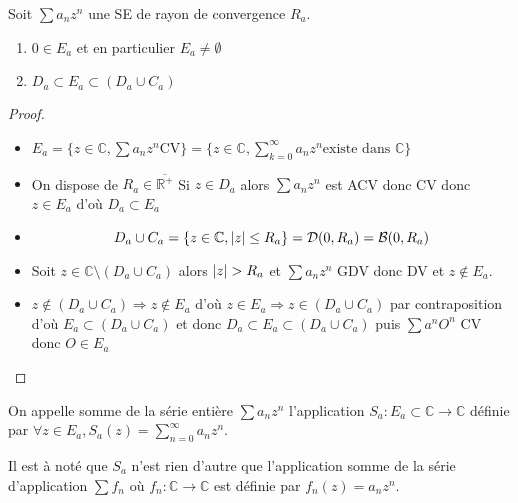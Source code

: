 \documentclass[11pt,hidelinks]{book}
\theoremstyle{mytheoremstyle}
\theoremstyle{mytheoremstyle}
\theoremstyle{mytheoremstyle}
\theoremstyle{mytheoremstyle}
\theoremstyle{mytheoremstyle}
\theoremstyle{mytheoremstyle}
\theoremstyle{mytheoremstyle}
\theoremstyle{mytheoremstyle}
\theoremstyle{myproblemstyle}
\def\mbb#1{\mathbb{#1}}
\def\mfc#1{\mathcal{#1}}
\def\bC{\mbb{C}}
\def\bR{\mbb{R}}
\def\se{\sum a_n z^n}
\newcommand{\func}[3]{#1\colon#2\to#3}
\newcommand{\parenth}[1]{\left(#1\right)}
\begin{document}
\begin{adjustwidth}{-2em}{-1em}
\begin{prop}
    Soit $\se$ une SE de rayon de convergence $R_a$.
    \begin{enumerate} 
    \item $0 \in E_a$ et en particulier $E_a \not= \emptyset$  
    \item $D_a \subset E_a \subset \parenth{D_a \cup C_a}$ 
    \end{enumerate}
    \begin{proof}
        \begin{itemize}[label=$\cdot$]
        \item $E_a = \{z \in \bC, \se \text{CV}\} = \{z \in \bC
        , \sum_{k=0}^{\infty} a_n z^n \text{existe dans $\bC$}\}$
         
        \item On dispose de $R_a \in \overline{\bR^+}$
        Si $z \in D_a$ alors $\se$ est ACV donc CV donc $z \in E_a$
        d'où $D_a \subset E_a$
         
        \item \begin{equation*}
            D_a \cup C_a = \{z \in \bC, \abs{z} \leq R_a\} = \mfc{D}(0, R_a) = \mfc{B}(0, R_a)
        \end{equation*}
         
        \item Soit $z \in \bC \setminus (D_a \cup C_a)$ alors $\abs{z} > R_a$ 
        et $\se$ GDV donc DV et $z \not \in E_a$. 
        \item $z \not \in (D_a \cup C_a) \Rightarrow z \not \in E_a$ d'où 
        $z \in E_a \Rightarrow z \in (D_a \cup C_a)$ par contraposition 
        d'où $E_a \subset (D_a \cup C_a)$ et donc 
        $D_a \subset E_a \subset (D_a \cup C_a)$
        puis $\sum a^n O^n$ CV donc $O \in E_a$ 
    \end{itemize}
    \end{proof}
\end{prop}
\end{adjustwidth}
\begin{definition}
    On appelle somme de la série entière $\se$ l'application
    $\func{S_a}{E_a \subset \bC}{\bC}$ définie par 
    $\forall z \in E_a, S_a(z) = \sum_{n=0}^{\infty} a_n z^n$.
\end{definition}
\begin{rmq}
    Il est à noté que $S_a$ n'est rien d'autre que l'application somme 
    de la série d'application $\sum f_n$ où $\func{f_n}{\bC}{\bC}$ est définie 
    par $f_n(z) = a_n z^n$.
\end{rmq}
\end{document}
